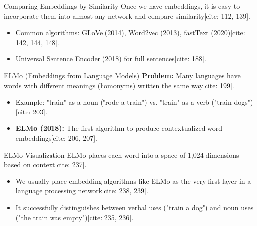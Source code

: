 \documentclass{beamer}
\begin{document}
	\begin{frame}{Comparing Embeddings by Similarity}
		Once we have embeddings, it is easy to incorporate them into almost any network and compare similarity[cite: 112, 139].
		
		\vspace{0.3cm}
		\vspace{0.3cm}
		
		\begin{itemize}
			\item Common algorithms: GLoVe (2014), Word2vec (2013), fastText (2020)[cite: 142, 144, 148].
			\item Universal Sentence Encoder (2018) for full sentences[cite: 188].
		\end{itemize}
		
	\end{frame}
	
	\begin{frame}{ELMo (Embeddings from Language Models)}
		\textbf{Problem:} Many languages have words with different meanings (homonyms) written the same way[cite: 199].
		\begin{itemize}
			\item Example: "train" as a noun ("rode a train") vs. "train" as a verb ("train dogs")[cite: 203].
			\item \textbf{ELMo (2018):} The first algorithm to produce contextualized word embeddings[cite: 206, 207].
		\end{itemize}
		
		\vspace{0.2cm}
		\vspace{0.2cm}
		
	\end{frame}
	
	\begin{frame}{ELMo Visualization}
		ELMo places each word into a space of 1,024 dimensions based on context[cite: 237].
		
		\vspace{0.3cm}
		\vspace{0.3cm}
		
		\begin{itemize}
			\item We usually place embedding algorithms like ELMo as the very first layer in a language processing network[cite: 238, 239].
			\item It successfully distinguishes between verbal uses ("train a dog") and noun uses ("the train was empty")[cite: 235, 236].
		\end{itemize}
	\end{frame}
	
\end{document}
